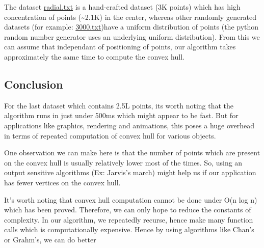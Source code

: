 The dataset \href{./datasets/radial.txt}{radial.txt} is a hand-crafted
dataset (3K points) which has high concentration of points
(\textasciitilde2.1K) in the center, whereas other randomly generated
datasets (for example: \href{./datasets/3000.txt}{3000.txt})have a
uniform distribution of points (the python random number generator uses
an underlying uniform distribution). From this we can assume that
independant of positioning of points, our algorithm takes approximately
the same time to compute the convex hull.

\hypertarget{conclusion}{%
\subsection{Conclusion}\label{conclusion}}

For the last dataset which contains 2.5L points, its worth noting that
the algorithm runs in just under 500ms which might appear to be fast.
But for applications like graphics, rendering and animations, this poses
a huge overhead in terms of repeated computation of convex hull for
various objects.

One observation we can make here is that the number of points which are
present on the convex hull is usually relatively lower most of the
times. So, using an output sensitive algorithms (Ex: Jarvis's march)
might help us if our application has fewer vertices on the convex hull.

It's worth noting that convex hull computation cannot be done under O(n
log n) which has been proved. Therefore, we can only hope to reduce the
constants of complexity. In our algorithm, we repeatedly recurse, hence
make many function calls which is computationally expensive. Hence by
using algorithms like Chan's or Grahm's, we can do better
